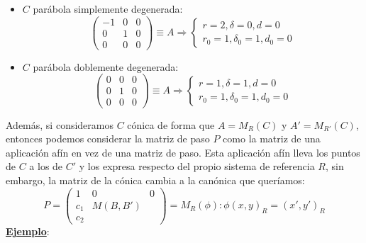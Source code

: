 \documentclass[10pt,a4paper,openright]{book}
\begin{document}
\begin{itemize}
$$\begin{array}{c|cc}
0 & 0 & \frac{-1}{2} \\
\hline
0 & 1  & 0  \\
\frac{-1}{2} &  0 & 0
\end{array}
\right) \equiv A \Rightarrow \begin{cases} r= 3 , \delta = 1, d < 0 \\ r_0 = 1, \delta_0 = 1, d_0 = 0 \end{cases}$$
\item $C$ parábola simplemente degenerada:
$$\left(\begin{array}{c|cc}
-1 & 0 & 0 \\
\hline
0 & 1  & 0  \\
0 &  0 & 0
\end{array}
\right) \equiv A \Rightarrow \begin{cases} r= 2 , \delta = 0, d = 0 \\ r_0 = 1, \delta_0 = 1, d_0 = 0 \end{cases}$$
\item $C$ parábola doblemente degenerada:
$$\left(\begin{array}{c|cc}
0 & 0 & 0 \\
\hline
0 & 1  & 0  \\
0 &  0 & 0
\end{array}
\right) \equiv A \Rightarrow \begin{cases} r= 1, \delta = 1, d = 0 \\ r_0 = 1, \delta_0 = 1, d_0 = 0 \end{cases}$$
\end{itemize}
Además, si consideramos $C$ cónica de forma que $A = M_R (C)$ y $A' = M_{R'} (C)$, entonces podemos considerar la matriz de paso $P$ como la matriz de una aplicación afín en vez de una matriz de paso. Esta aplicación afín lleva los puntos de $C$ a los de $C'$ y los expresa respecto del propio sistema de referencia $R$, sin embargo, la matriz de la cónica cambia a la canónica que queríamos:
$$P=\left(\begin{array}{c|cc}
1 & 0 & 0 \\
\hline
c_1 & M(B, B')  &   \\
c_2 &  &
\end{array}
\right) = M_R (\phi) : \phi (x,y)_R = (x', y')_R $$
\underline{\textbf{Ejemplo}}:
\end{document}
